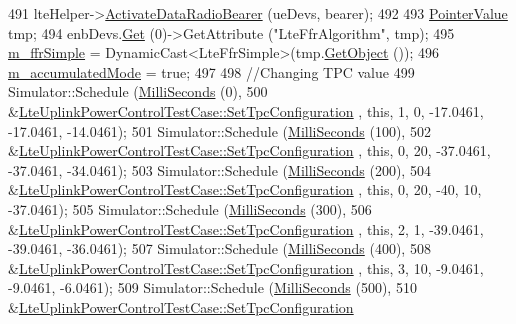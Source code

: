 \begin{DoxyCode}
491   lteHelper->\hyperlink{classns3_1_1LteHelper_ac896e16cf162e4beeaa292d39ab1b700}{ActivateDataRadioBearer} (ueDevs, bearer);
492 
493   \hyperlink{classns3_1_1PointerValue}{PointerValue} tmp;
494   enbDevs.\hyperlink{classns3_1_1PointerValue_ae8e90fe3c0810cd6e4e1b1ba31f52a66}{Get} (0)->GetAttribute (\textcolor{stringliteral}{"LteFfrAlgorithm"}, tmp);
495   \hyperlink{classLteUplinkPowerControlTestCase_ac0e14f35a6bc7b99242efc3985a87d4e}{m\_ffrSimple} = DynamicCast<LteFfrSimple>(tmp.\hyperlink{classns3_1_1PointerValue_a53d0f9f5c538ea6120c96a1ecb1344a8}{GetObject} ());
496   \hyperlink{classLteUplinkPowerControlTestCase_a68142bcda5a786775546febd8aed11df}{m\_accumulatedMode} = \textcolor{keyword}{true};
497 
498   \textcolor{comment}{//Changing TPC value}
499   Simulator::Schedule (\hyperlink{group__timecivil_gaf26127cf4571146b83a92ee18679c7a9}{MilliSeconds} (0),
500                        &\hyperlink{classLteUplinkPowerControlTestCase_a91e2e46a5fa22677a33d5328ac9789b8}{LteUplinkPowerControlTestCase::SetTpcConfiguration}
      , \textcolor{keyword}{this}, 1, 0, -17.0461, -17.0461, -14.0461);
501   Simulator::Schedule (\hyperlink{group__timecivil_gaf26127cf4571146b83a92ee18679c7a9}{MilliSeconds} (100),
502                        &\hyperlink{classLteUplinkPowerControlTestCase_a91e2e46a5fa22677a33d5328ac9789b8}{LteUplinkPowerControlTestCase::SetTpcConfiguration}
      , \textcolor{keyword}{this}, 0, 20, -37.0461, -37.0461, -34.0461);
503   Simulator::Schedule (\hyperlink{group__timecivil_gaf26127cf4571146b83a92ee18679c7a9}{MilliSeconds} (200),
504                        &\hyperlink{classLteUplinkPowerControlTestCase_a91e2e46a5fa22677a33d5328ac9789b8}{LteUplinkPowerControlTestCase::SetTpcConfiguration}
      , \textcolor{keyword}{this}, 0, 20, -40, 10, -37.0461);
505   Simulator::Schedule (\hyperlink{group__timecivil_gaf26127cf4571146b83a92ee18679c7a9}{MilliSeconds} (300),
506                        &\hyperlink{classLteUplinkPowerControlTestCase_a91e2e46a5fa22677a33d5328ac9789b8}{LteUplinkPowerControlTestCase::SetTpcConfiguration}
      , \textcolor{keyword}{this}, 2, 1, -39.0461, -39.0461, -36.0461);
507   Simulator::Schedule (\hyperlink{group__timecivil_gaf26127cf4571146b83a92ee18679c7a9}{MilliSeconds} (400),
508                        &\hyperlink{classLteUplinkPowerControlTestCase_a91e2e46a5fa22677a33d5328ac9789b8}{LteUplinkPowerControlTestCase::SetTpcConfiguration}
      , \textcolor{keyword}{this}, 3, 10, -9.0461, -9.0461, -6.0461);
509   Simulator::Schedule (\hyperlink{group__timecivil_gaf26127cf4571146b83a92ee18679c7a9}{MilliSeconds} (500),
510                        &\hyperlink{classLteUplinkPowerControlTestCase_a91e2e46a5fa22677a33d5328ac9789b8}{LteUplinkPowerControlTestCase::SetTpcConfiguration}

\end{DoxyCode}
